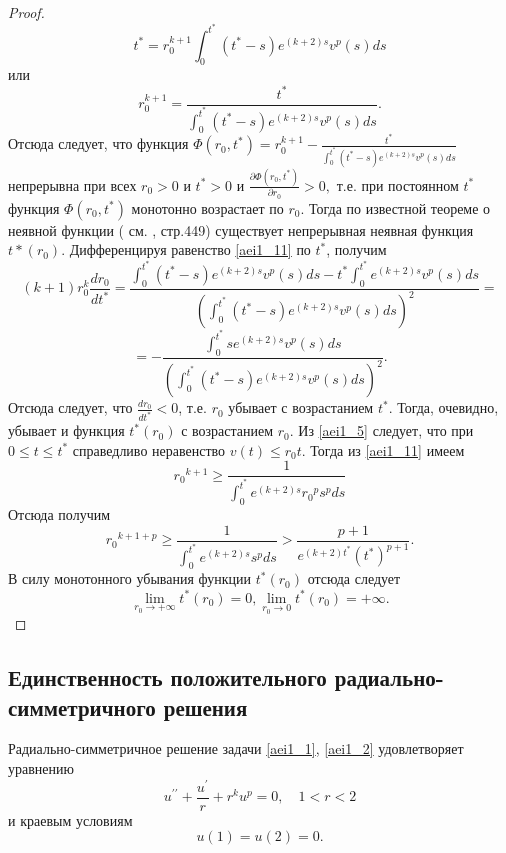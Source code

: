 \begin{proof}
$$
t^*=r_0^{k+1}\int_0^{t^*}(t^*-s)e^{(k+2)s}v^p(s)ds
$$
или
\begin{equation}\label{aei1_11}
r_0^{k+1}=\frac{t^*}{\int_0^{t^*}(t^*-s)e^{(k+2)s}v^p(s)ds}.
\end{equation}
Отсюда следует, что функция $
\Phi(r_0,t^*)=r_0^{k+1}-\frac{t^*}{\int_0^{t^*}(t^*-s)e^{(k+2)s}v^p(s)ds}$
непрерывна при всех $ r_0>0 $ и $ t^*>0 $ и $ \frac{\partial
\Phi(r_0,t^*)}{\partial r_0}>0, $ т.е. при постоянном $ t^* $
функция $ \Phi(r_0,t^*)$ монотонно возрастает по $ r_0 $. Тогда по
известной теореме о неявной функции ( см. \cite{aeiL_15}, стр.449) существует
непрерывная неявная функция $ t*(r_0). $  Дифференцируя равенство
\eqref{aei1_11} по $ t^* $, получим
$$
(k+1)r_0^k \frac{dr_0}{dt^*}= \frac
{\int_0^{t^*}(t^*-s)e^{(k+2)s}v^p(s)ds- t^*
\int_0^{t^*}e^{(k+2)s}v^p(s)ds} { \left (
\int_0^{t^*}(t^*-s)e^{(k+2)s}v^p(s)ds \right )^2}=
$$
$$
=-\frac {\int_0^{t^*}se^{(k+2)s}v^p(s)ds}{ \left (
\int_0^{t^*}(t^*-s)e^{(k+2)s}v^p(s)ds \right )^2}.
$$
Отсюда следует, что $ \frac{dr_0}{dt^*} <0 $, т.е. $ r_0 $ убывает с
возрастанием $ t^* $. Тогда, очевидно, убывает и функция $ t^*(r_0)
$ с возрастанием $ r_0 $. Из \eqref{aei1_5} следует, что при $ 0 \leq t \leq
t^* $ справедливо неравенство $ v(t) \leq r_0t$. 
Тогда из \eqref{aei1_11} имеем
$$
{r_0}^{k+1} \geq \frac{1}{\int_0^{t^*}e^{(k+2)s}{r_0}^ps^pds}
$$
Отсюда получим
\begin{equation}\label{aei1_12}
{r_0}^{k+1+p} \geq \frac{1}{\int_0^{t^*}e^{(k+2)s}s^pds} >
\frac{p+1}{e^{(k+2)t^*} (t^*)^{p+1}}. 
\end{equation}
В силу монотонного убывания  функции $ t^*(r_0) $ отсюда следует
$$
\displaystyle \lim_{r_0 \to +\infty}t^{*}(r_0)=0, \displaystyle
\lim_{r_0 \to 0}t^{*}(r_0)=+\infty.
$$
\end{proof}

 \subsection{Единственность положительного радиально-симметричного решения}

Радиально-симметричное решение задачи \eqref{aei1_1}, \eqref{aei1_2} удовлетворяет
уравнению
\begin{equation}\label{aei1_13}
u^{\prime\prime}+\frac{u^{\prime}}{r}+r^ku^p=0, \quad 1<r<2
\end{equation}
и краевым условиям
\begin{equation}\label{aei1_14}
u(1)=u(2)=0. 
\end{equation}

